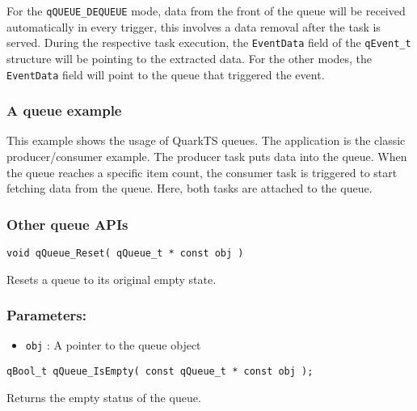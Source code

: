 \begin{tcolorbox}
\HandRight For the \lstinline{qQUEUE_DEQUEUE} mode,  data from the front of the queue will be received automatically in every trigger, this involves a data removal after the task is served. During the respective task execution, the \lstinline{EventData} field of the \lstinline{qEvent_t} structure will be pointing to the extracted data. For the other modes, the \lstinline{EventData} field will point to the queue that triggered the event.
\end{tcolorbox}
    
\subsubsection{A queue example}
This example shows the usage of QuarkTS queues. The application is the classic producer/consumer example. The producer task puts data into the queue. When the queue reaches a specific item count, the consumer task is triggered to start fetching data from the queue. Here, both tasks are attached to the queue. 
\medskip



\subsubsection{Other queue APIs}

\begin{lstlisting}[style=CStyle]
void qQueue_Reset( qQueue_t * const obj )
\end{lstlisting}

Resets a queue to its original empty state. 

\subsubsection*{Parameters:}
\begin{itemize}
    \item \lstinline{obj} : A pointer to the queue object
\end{itemize}

\noindent\hrulefill


\begin{lstlisting}[style=CStyle]
qBool_t qQueue_IsEmpty( const qQueue_t * const obj );
\end{lstlisting}

Returns the empty status of the queue. 

